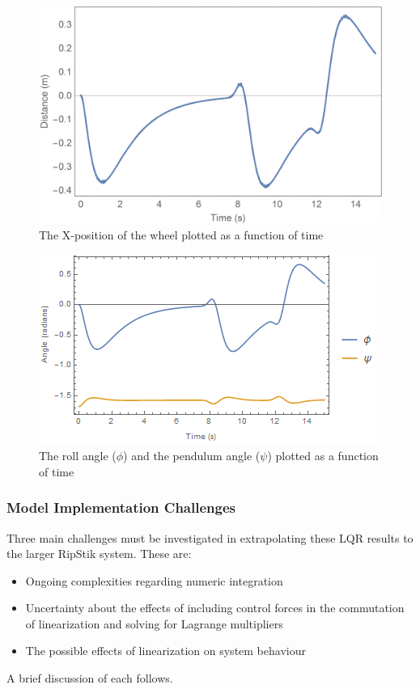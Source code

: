 \begin{figure}[!htb]
	\centering
	\includegraphics[width=\linewidth]{wheelperturbdistance.jpg}
	\endminipage\hspace{1em}%
	\caption{The X-position of the wheel plotted as a function of time}\label{fig:wheelperturbdistance}
\end{figure}

\begin{figure}[!htb]
	\centering
	\includegraphics[width=\linewidth]{wheelperturbphipsi.png}
	\endminipage\hspace{1em}%
	\caption{The roll angle ($\phi$) and the pendulum angle ($\psi$) plotted as a function of time}\label{fig:wheelperturbphipsi}
\end{figure}

\par
\subsubsection{Model Implementation Challenges} \label{sec:challenge}
Three main challenges must be investigated in extrapolating these LQR results to the larger RipStik system. These are:
\begin{itemize}
	\item Ongoing complexities regarding numeric integration
	\item Uncertainty about the effects of including control forces in the commutation of linearization and solving for Lagrange multipliers
	\item The possible effects of linearization on system behaviour
\end{itemize}
A brief discussion of each follows.

